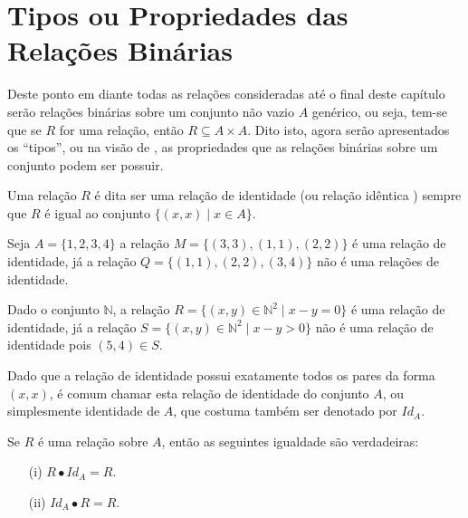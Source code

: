 \section{Tipos ou Propriedades das Relações Binárias}\label{sec:TipoDasRelacoesBinarias}

Deste ponto em diante todas as relações consideradas até o final deste capítulo serão relações binárias sobre um conjunto não vazio $A$ genérico, ou seja, tem-se que se $R$ for uma relação, então $R \subseteq A \times A$. Dito isto, agora serão apresentados os ``tipos'', ou na visão de \cite{abe1991-TC}, as propriedades que as relações binárias sobre um conjunto podem ser possuir.

\begin{definition}\label{def:RelacaoIdentica}
	Uma relação $R$ é dita ser uma relação de identidade (ou relação idêntica \cite{abe1991-TC}) sempre que $R$ é igual ao conjunto $\{(x, x) \mid x \in A\}$.
\end{definition}

\begin{example}
	Seja $A = \{1, 2, 3, 4\}$ a relação $M = \{(3, 3), (1, 1), (2,2)\}$ é uma relação de identidade, já a relação $Q = \{(1, 1), (2,2), (3,4)\}$ não é uma relações de identidade.
\end{example}

\begin{example}
	Dado o conjunto $\mathbb{N}$, a relação $R = \{(x, y) \in \mathbb{N}^2 \mid x - y = 0\}$ é uma relação de identidade, já a relação $S =  \{(x, y) \in \mathbb{N}^2 \mid x - y > 0\}$ não é uma relação de identidade pois $(5, 4) \in S$.
\end{example}

\begin{remark}
	Dado que a relação de identidade possui exatamente todos os pares da forma $(x, x)$, é comum chamar esta relação de identidade do conjunto $A$, ou simplesmente identidade de $A$, que costuma também ser denotado por $Id_A$.
\end{remark}

\begin{theorem}\label{teo:NeutralidadeRelacaoIdentidade}
	Se $R$ é uma relação sobre $A$, então as seguintes igualdade são verdadeiras:
	\begin{itemize}
		\item[(i)] $R \bullet Id_A = R$.
		\item[(ii)] $Id_A \bullet R = R$.
	\end{itemize}
\end{theorem}

